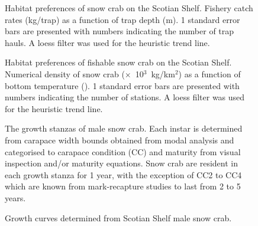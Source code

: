 \documentclass[11pt]{article}
\newcommand*{\D}{.}  %
\newcommand{\sq}{$^2$}
\newcommand{\kmsq}{km\sq}
\newcommand{\Xthou}{$\times$~10$^3$}
\begin{document}
\begin{figure}[]
\begin{center}
\end{center}
\caption{ Habitat preferences of snow crab on the Scotian Shelf. Fishery catch rates (kg/trap) as a function of trap depth (m). 1 standard error bars are presented with numbers indicating the number of trap hauls. A loess filter was used for the heuristic trend line. }
\label{habitattemplate.cpue.depth}
\end{figure}

\begin{figure}[]
\begin{center}
\end{center}
\caption{ Habitat preferences of fishable snow crab on the Scotian Shelf. Numerical density of snow crab (\Xthou~kg/\kmsq) as a function of bottom temperature (\celsius). 1 standard error bars are presented with numbers indicating the number of stations. A loess filter was used for the heuristic trend line. }
\label{habitattemplate.temperatures}
\end{figure}

\clearpage

\newpage
\begin{figure}[!ht]
\begin{center}
\end{center}
\caption{The growth stanzas of male snow crab. Each instar is determined from carapace width bounds obtained from modal analysis and categorised to carapace condition (CC) and maturity from visual inspection and/or maturity equations. Snow crab are resident in each growth stanza for 1 year, with the exception of CC2 to CC4 which are known from mark-recapture studies to last from 2 to 5 years.}
\label{male.growth.stanzas}
\end{figure}

\begin{figure}[t]
\begin{center}
\begin{minipage}{5in}
\end{minipage}
\begin{minipage}{5in}
\end{minipage}
\end{center}
\caption{Growth curves determined from Scotian Shelf male snow crab.}
\label{growth.curves}
\end{figure}
\end{document}
